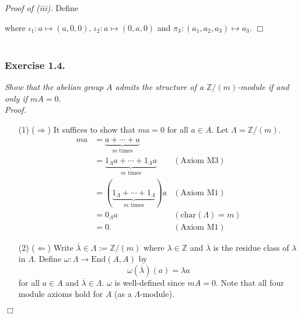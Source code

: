 \documentclass{article}
\begin{document}
\emph{Proof of (iii).}
  Define
  \begin{center}
  \end{center}
  where $\iota_1: a \mapsto (a, 0, 0)$, $\iota_2: a \mapsto (0, a, 0)$
  and $\pi_3: (a_1, a_2, a_3) \mapsto a_3$.
$\Box$ \\\\






\subsubsection*{Exercise 1.4.}
\emph{Show that the abelian group $A$ admits the structure of a $\mathbb{Z}/(m)$-module
if and only if $mA = 0$.} \\



\emph{Proof.}
\begin{enumerate}
\item[(1)]
  ($\Longrightarrow$)
  It suffices to show that $ma = 0$ for all $a \in A$.
  Let $\Lambda = \mathbb{Z}/(m)$.
  \begin{align*}
    ma
    &= \underbrace{a + \cdots + a}_{\text{$m$ times}} \\
    &= \underbrace{1_\Lambda a + \cdots + 1_\Lambda a}_{\text{$m$ times}}
      &(\text{Axiom M3}) \\
    &= (\underbrace{1_\Lambda + \cdots + 1_\Lambda}_{\text{$m$ times}}) a
      &(\text{Axiom M1}) \\
    &= 0_\Lambda a
      &(\mathrm{char}(\Lambda) = m) \\
    &= 0.
      &(\text{Axiom M1})
  \end{align*}

\item[(2)]
  ($\Longleftarrow$)
  Write $\overline{\lambda} \in \Lambda := \mathbb{Z}/(m)$ where
  $\lambda \in \mathbb{Z}$ and
  $\overline{\lambda}$ is the residue class of $\lambda$ in $\Lambda$.
  Define $\omega: \Lambda \to \mathrm{End}(A, A)$
  by
  \[
    \omega(\overline{\lambda})(a) = \lambda a
  \]
  for all $a \in A$ and $\overline{\lambda} \in \Lambda$.
  $\omega$ is well-defined since $mA = 0$.
  Note that all four module axioms hold for $A$ (as a $\Lambda$-module).
\end{enumerate}
$\Box$ \\\\
\end{document}

